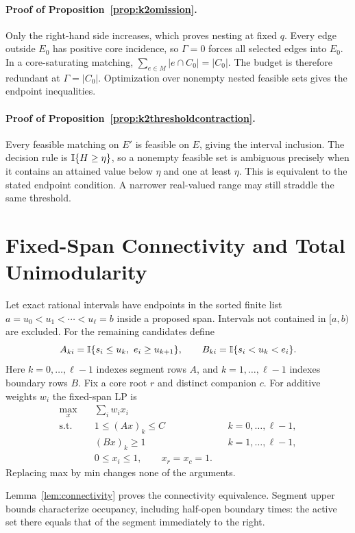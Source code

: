 \paragraph{Proof of Proposition~\ref{prop:k2omission}.}
Only the right-hand side increases, which proves nesting at fixed $q$.
Every edge outside $E_0$ has positive core incidence, so $\Gamma=0$ forces all
selected edges into $E_0$. In a core-saturating matching,
$\sum_{e\in M}|e\cap C_0|=|C_0|$. The budget is therefore redundant at
$\Gamma=|C_0|$. Optimization over nonempty nested feasible sets gives the
endpoint inequalities.

\paragraph{Proof of Proposition~\ref{prop:k2thresholdcontraction}.}
Every feasible matching on $E'$ is feasible on $E$, giving the interval
inclusion. The decision rule is $\mathbb I\{H\ge\eta\}$, so a nonempty feasible set
is ambiguous precisely when it contains an attained value below $\eta$ and
one at least $\eta$. This is equivalent to the stated endpoint condition.
A narrower real-valued range may still straddle the same threshold.

\section{Fixed-Span Connectivity and Total Unimodularity}
Let exact rational intervals have endpoints in the sorted finite list
$a=u_0<u_1<\cdots<u_\ell=b$ inside a proposed span. Intervals not contained
in $[a,b)$ are excluded. For the remaining candidates define
\[
 A_{ki}=\mathbb I\{s_i\le u_k,\ e_i\ge u_{k+1}\},\qquad
 B_{ki}=\mathbb I\{s_i<u_k<e_i\}.
\]
Here $k=0,\ldots,\ell-1$ indexes segment rows $A$, and
$k=1,\ldots,\ell-1$ indexes boundary rows $B$. Fix a core root $r$ and distinct
companion $c$. For additive weights $w_i$ the fixed-span LP is
\begin{align*}
 \max_x\quad &\sum_i w_ix_i\\
 \text{s.t.}\quad &1\le (Ax)_k\le C
       && k=0,\ldots,\ell-1,\\
 &(Bx)_k\ge1 &&k=1,\ldots,\ell-1,\\
 &0\le x_i\le1,\qquad x_r=x_c=1.
\end{align*}
Replacing max by min changes none of the arguments.

Lemma~\ref{lem:connectivity} proves the connectivity equivalence. Segment
upper bounds characterize occupancy, including half-open boundary times:
the active set there equals that of the segment immediately to the right.

